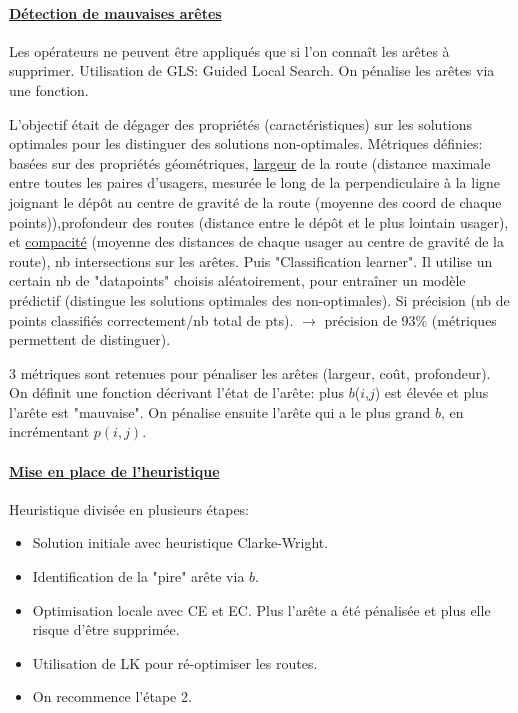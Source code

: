 \documentclass[a4paper,11pt]{report}%
\begin{document}
\paragraph{\underline{Détection de mauvaises arêtes}}

Les opérateurs ne peuvent être appliqués que si l'on connaît les arêtes à supprimer. Utilisation de GLS: Guided Local Search. On pénalise les arêtes via une fonction. 

L'objectif était de dégager des propriétés (caractéristiques) sur les solutions optimales pour les distinguer des solutions non-optimales. Métriques définies: basées sur des propriétés géométriques, \underline{largeur} de la route (distance maximale entre toutes les paires d'usagers, mesurée le long de la perpendiculaire à la ligne joignant le dépôt au centre de gravité de la route (moyenne des coord de chaque points)),profondeur des routes (distance entre le dépôt et le plus lointain usager), et \underline{compacité} (moyenne des distances de chaque usager au centre de gravité de la route), nb intersections sur les arêtes. Puis "Classification learner". Il utilise un certain nb de "datapoints" choisis aléatoirement, pour entraîner un modèle prédictif (distingue les solutions optimales des non-optimales). Si précision (nb de points classifiés correctement/nb total de pts). $\rightarrow$ précision de 93\% (métriques permettent de distinguer). 

3 métriques sont retenues pour pénaliser les arêtes (largeur, coût, profondeur). On définit une fonction décrivant l'état de l'arête: plus $b$($i$,$j$) est élevée et plus l'arête est "mauvaise". On pénalise ensuite l'arête qui a le plus grand $b$, en incrémentant $p(i,j)$.

\paragraph{\underline{Mise en place de l'heuristique}}

Heuristique divisée en plusieurs étapes:
\begin{itemize}
\item Solution initiale avec heuristique Clarke-Wright. 
\item Identification de la "pire" arête via $b$.
\item Optimisation locale avec CE et EC. Plus l'arête a été pénalisée et plus elle risque d'être supprimée.
\item Utilisation de LK pour ré-optimiser les routes.
\item On recommence l'étape 2.
\end{itemize}
\end{document}
